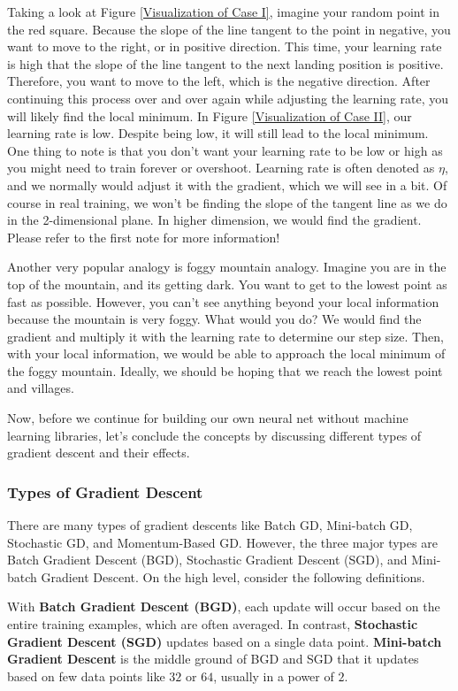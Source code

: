 \documentclass[../../../main.tex]{subfiles}
\begin{document}
Taking a look at Figure \ref{Visualization of Case I}, imagine your
random point in the red square. Because the slope of the line
tangent to the point in negative, you want to move to the right,
or in positive direction. This time, your learning rate is high that
the slope of the line tangent to the next landing position is
positive. Therefore, you want to move to the left, which is the
negative direction. After continuing this process over and over again
while adjusting the learning rate, you will likely find the local
minimum. In Figure \ref{Visualization of Case II}, our learning
rate is low. Despite being low, it will still lead to the local
minimum. One thing to note is that you don't want your learning rate
to be low or high as you might need to train forever or overshoot.
Learning rate is often denoted as $\eta$, and we normally would
adjust it with the gradient, which we will see in a bit. Of course
in real training, we won't be finding the slope of the tangent line as
we do in the 2-dimensional plane. In higher dimension, we would find
the gradient. Please refer to the first note for more information!

Another very popular analogy is foggy mountain analogy. Imagine you
are in the top of the mountain, and its getting dark. You want to
get to the lowest point as fast as possible. However, you can't see
anything beyond your local information because the mountain is very
foggy. What would you do? We would find the gradient and multiply
it with the learning rate to determine our step size. Then, with
your local information, we would be able to approach the local
minimum of the foggy mountain. Ideally, we should be hoping that
we reach the lowest point and villages.

Now, before we continue for building our own neural net without
machine learning libraries, let's conclude the concepts by
discussing different types of gradient descent and their effects.

\subsubsection{Types of Gradient Descent}

There are many types of gradient descents like Batch GD,
Mini-batch GD, Stochastic GD, and Momentum-Based GD. However,
the three major types are Batch Gradient Descent (BGD), Stochastic
Gradient Descent (SGD), and Mini-batch Gradient Descent. On the
high level, consider the following definitions.

\begin{definition}{}{}
With \textbf{Batch Gradient Descent (BGD)}, each update will
occur based on the entire training examples, which are often
averaged. In contrast, \textbf{Stochastic Gradient Descent (SGD)}
updates based on a single data point. \textbf{Mini-batch Gradient
Descent} is the middle ground of BGD and SGD that it updates based
on few data points like $32$ or $64$, usually in a power of $2$.
\end{definition}
\end{document}
